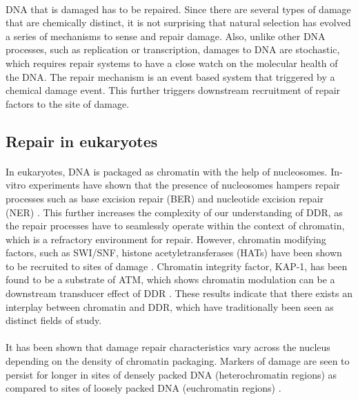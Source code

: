 \paragraph*{} DNA that is damaged has to be repaired. Since there are several types of damage that are chemically distinct, it is not surprising that natural selection has evolved a series of mechanisms to sense and repair damage. Also, unlike other DNA processes, such as replication or transcription, damages to DNA are stochastic, which requires repair systems to have a close watch on the molecular health of the DNA. The repair mechanism is an event based system that triggered by a chemical damage event. This further triggers downstream recruitment of repair factors to the site of damage.

\subsection{Repair in eukaryotes}
\paragraph*{} In eukaryotes, DNA is packaged as chromatin with the help of nucleosomes. In-vitro experiments have shown that the presence of nucleosomes hampers repair processes such as base excision repair (BER) and nucleotide excision repair (NER) \cite{hara2000dna, odell2011nucleosome}. This further increases the complexity of our understanding of DDR, as the repair processes have to seamlessly operate within the context of chromatin, which is a refractory environment for repair. However, chromatin modifying factors, such as SWI/SNF, histone acetyletransferases (HATs) have been shown to be recruited to sites of damage \cite{park2006mammalian, polo2010regulation}. Chromatin integrity factor, KAP-1, has been found to be a substrate of ATM, which shows chromatin modulation can be a downstream transducer effect of DDR \cite{ziv2006chromatin}. These results indicate that there exists an interplay between chromatin and DDR, which have traditionally been seen as distinct fields of study.

\paragraph*{} It has been shown that damage repair characteristics vary across the nucleus depending on the density of chromatin packaging. Markers of damage are seen to persist for longer in sites of densely packed DNA (heterochromatin regions) as compared to sites of loosely packed DNA (euchromatin regions) \cite{goodarzi2008atm}.

